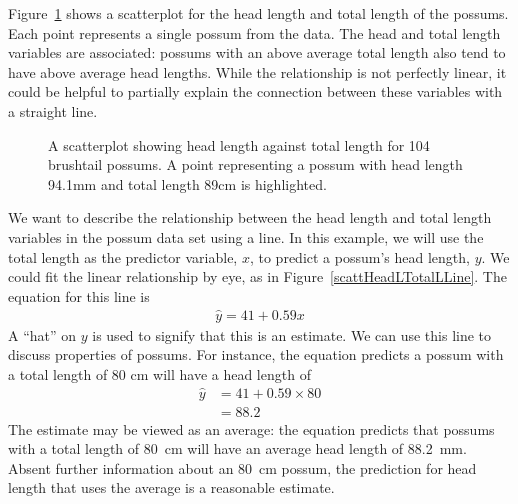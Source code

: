 Figure~\ref{scattHeadLTotalL} shows a scatterplot for the head
length and total length of the possums.
Each point represents a single possum from the data.
The head and total length variables are associated:
possums with an above average total length also tend to have
above average head lengths.
While the relationship is not perfectly linear, it could
be helpful to partially explain the connection between these
variables with a straight line.

\D{\newpage}

\begin{figure}[h]
  \centering
  \caption{A scatterplot showing head length against total length
      for 104 brushtail possums.
      A point representing a possum with head length 94.1mm
      and total length 89cm is highlighted.}
  \label{scattHeadLTotalL}
\end{figure}



We want to describe the relationship between the head length and total length variables in the possum data set using a line. In this example, we will use the total length as the predictor variable, $x$, to predict a possum's head length, $y$. We could fit the linear relationship by eye, as in Figure~\ref{scattHeadLTotalLLine}. The equation for this line is
\begin{align*}
\hat{y} = 41 + 0.59x
\end{align*}
A ``hat'' on $y$ is used to signify that this is an estimate.
We can use this line to discuss properties of possums.
For instance, the equation predicts a possum with a total length
of 80 cm will have a head length of
\begin{align*}
\hat{y} &= 41 + 0.59\times 80 \\
	&= 88.2 %
\end{align*}
The estimate may be viewed as an average:
the equation predicts that possums with a total length of
80~cm will have an average head length of 88.2~mm.
Absent further information about an 80~cm possum,
the prediction for head length that uses the average
is a reasonable estimate.

